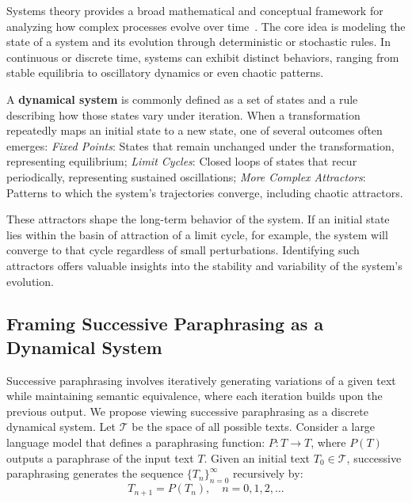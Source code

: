Systems theory provides a broad mathematical and conceptual framework for analyzing how complex processes evolve over time~\cite{system1}. 
The core idea is modeling the state of a system and its evolution through deterministic or stochastic rules. 
In continuous or discrete time, systems can exhibit distinct behaviors, ranging from stable equilibria to oscillatory dynamics or even chaotic patterns.

A \textbf{dynamical system} is commonly defined as a set of states and a rule describing how those states vary under iteration. 
When a transformation repeatedly maps an initial state to a new state, one of several outcomes often emerges:
\textit{Fixed Points}: States that remain unchanged under the transformation, representing equilibrium;
\textit{Limit Cycles}: Closed loops of states that recur periodically, representing sustained oscillations;
\textit{More Complex Attractors}: Patterns to which the system’s trajectories converge, including chaotic attractors.

These attractors shape the long-term behavior of the system. If an initial state lies within the basin of attraction of a limit cycle, for example, the system will converge to that cycle regardless of small perturbations. Identifying such attractors offers valuable insights into the stability and variability of the system’s evolution.

\subsection{Framing Successive Paraphrasing as a Dynamical System}
Successive paraphrasing involves iteratively generating variations of a given text while maintaining semantic equivalence, where each iteration builds upon the previous output. 
We propose viewing successive paraphrasing as a discrete dynamical system. 
Let $\mathcal{T}$ be the space of all possible texts. 
Consider a large language model that defines a paraphrasing function: $P: T \rightarrow T$,
where $P(T)$ outputs a paraphrase of the input text $T$. 
Given an initial text $T_0 \in \mathcal{T}$, successive paraphrasing generates the sequence $\{ T_n \}_{n=0}^\infty$ recursively by:
\begin{equation}
T_{n+1} = P(T_n), \quad n = 0, 1, 2, \dots    
\end{equation}

